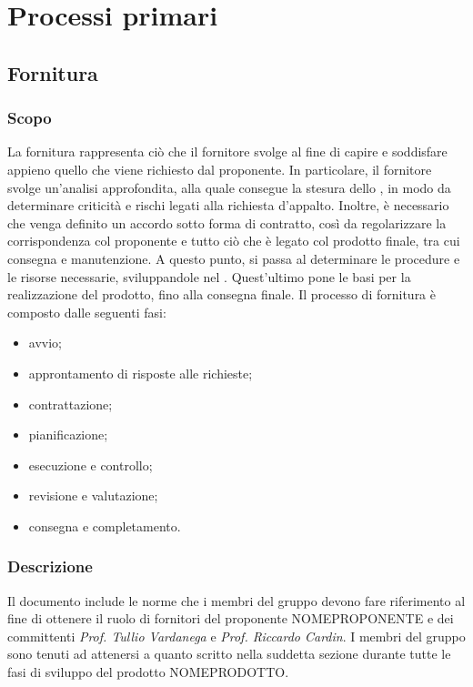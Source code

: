 \section{Processi primari}
\subsection{Fornitura}
\subsubsection{Scopo}
La fornitura rappresenta ciò che il fornitore svolge al fine di capire e soddisfare appieno quello che viene richiesto dal proponente.  In particolare,  il fornitore svolge un'analisi approfondita,  alla quale consegue la stesura dello \SdF{}, in modo da determinare criticità e rischi legati alla richiesta d'appalto. Inoltre, è necessario che venga definito un accordo sotto forma di contratto, così da regolarizzare la corrispondenza col proponente e tutto ciò che è legato col prodotto finale, tra cui consegna e manutenzione. A questo punto, si passa al determinare le procedure e le risorse necessarie,  sviluppandole nel \PdP{}. Quest'ultimo pone le basi per la realizzazione del prodotto, fino alla consegna finale.\newline 
Il processo di fornitura è composto dalle seguenti fasi:
\begin{itemize}
	\item avvio;
	\item approntamento di risposte alle richieste;
	\item contrattazione;
	\item pianificazione;
	\item esecuzione e controllo;
	\item revisione e valutazione;
	\item consegna e completamento.
\end{itemize}
\subsubsection{Descrizione}
Il documento include le norme che i membri del gruppo \Gruppo{} devono fare riferimento al fine di ottenere il ruolo di fornitori del proponente NOMEPROPONENTE e dei committenti \textit{Prof. Tullio Vardanega} e \textit{Prof. Riccardo Cardin}. I membri del gruppo sono tenuti ad attenersi a quanto scritto nella suddetta sezione durante tutte le fasi di sviluppo del prodotto NOMEPRODOTTO.
